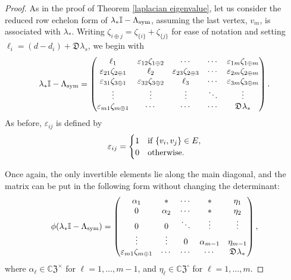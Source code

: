 \documentclass{article}
\theoremstyle{definition}
\newcommand{\zdu}{\mathfrak{D}\mspace{1mu}}
\newcommand{\CZ}{\mathbb{C}\mathfrak{Z}}
\newcommand{\mI}{\mathbb{I}}
\numberwithin{equation}{section}
\begin{document}
\begin{proof}
As in the proof of Theorem \ref{laplacian eigenvalue}, let us consider the reduced row echelon form of $\lambda_*\mI-\Lambda_{\rm sym}$, assuming the last vertex, $v_m$, is associated with $\lambda_*$.  Writing $\zeta_{i\oplus j}=\zeta_{\{i\}}+\zeta_{\{j\}}$ for ease of notation and setting $\ell_i=(d-d_i)+\zdu \lambda_s$, we begin with \begin{equation}
 \lambda_*\mI-\Lambda_{\rm sym}=\left(\begin{matrix}
\ell_1&\varepsilon_{12}\zeta_{1\oplus 2}&\cdots&\cdots&\varepsilon_{1 m}\zeta_{1\oplus m}\\
\varepsilon_{21}\zeta_{2\oplus 1}&\ell_2&\varepsilon_{23}\zeta_{2\oplus 3}&\cdots&\varepsilon_{2m}\zeta_{2\oplus m}\\
\varepsilon_{31}\zeta_{3\oplus 1}&\varepsilon_{32}\zeta_{3\oplus 2}&\ell_3&\cdots&\varepsilon_{3m}\zeta_{3\oplus m}\\
\vdots&\vdots&\vdots&\ddots&\vdots\\
\varepsilon_{m1}\zeta_{m\oplus 1}&\cdots&\cdots&\cdots&\zdu \lambda_*
\end{matrix}\right).  
 \end{equation}
As before,  $\varepsilon_{ij}$ is defined by 
\begin{equation*}
\varepsilon_{i j}=\begin{cases}
1&\text{\rm if }\{v_i,v_j\}\in E,\\
0&\text{\rm otherwise.}
\end{cases}
\end{equation*}

Once again, the only invertible elements lie along the main diagonal, and the matrix can be put in the following form without changing the determinant:
\begin{equation}\label{mostly triangular form of symmetric laplacian}
\phi(\lambda_*\mI-\Lambda_{\rm sym})=\left(\begin{matrix}
\alpha_1&*&\cdots&*&\eta_1\\
0&\alpha_2&\cdots&*&\eta_2\\
0&0&\ddots&\vdots&\vdots\\
\vdots&\vdots&0&\alpha_{m-1}&\eta_{m-1}\\
\varepsilon_{m1}\zeta_{m\oplus 1}&\cdots&\cdots&\cdots&\zdu \lambda_*
\end{matrix}\right),  
 \end{equation}
where $\alpha_\ell\in\CZ^\times$ for $\ell=1, \ldots, m-1$, and $\eta_\ell\in\CZ^\circ$ for $\ell=1, \ldots, m$.   


\end{proof}
\end{document}
